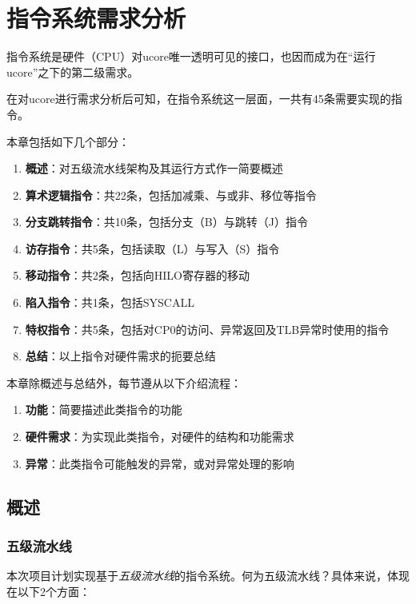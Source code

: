 \chapter{指令系统需求分析}

指令系统是硬件（CPU）对ucore唯一透明可见的接口，也因而成为在``运行ucore''之下的第二级需求。

在对ucore进行需求分析后可知，在指令系统这一层面，一共有45条需要实现的指令。

本章包括如下几个部分：

\begin{enumerate}
    \item {\bf 概述}：对五级流水线架构及其运行方式作一简要概述
    \item {\bf 算术逻辑指令}：共22条，包括加减乘、与或非、移位等指令
    \item {\bf 分支跳转指令}：共10条，包括分支（B）与跳转（J）指令
    \item {\bf 访存指令}：共5条，包括读取（L）与写入（S）指令
    \item {\bf 移动指令}：共2条，包括向HILO寄存器的移动
    \item {\bf 陷入指令}：共1条，包括SYSCALL
    \item {\bf 特权指令}：共5条，包括对CP0的访问、异常返回及TLB异常时使用的指令
    \item {\bf 总结}：以上指令对硬件需求的扼要总结
\end{enumerate}

本章除概述与总结外，每节遵从以下介绍流程：

\begin{enumerate}
    \item {\bf 功能}：简要描述此类指令的功能
    \item {\bf 硬件需求}：为实现此类指令，对硬件的结构和功能需求
    \item {\bf 异常}：此类指令可能触发的异常，或对异常处理的影响
\end{enumerate}

\section{概述}

\subsection{五级流水线}

本次项目计划实现基于\emph{五级流水线}的指令系统。何为五级流水线？具体来说，体现在以下2个方面：

